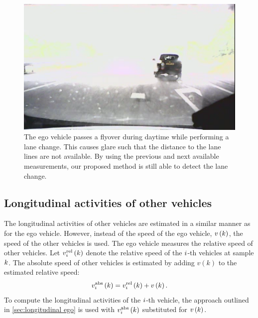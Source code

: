 \begin{figure}
	\centering
	\includegraphics[width=\linewidth]{figures/glare}
	\caption{\cstarta The ego vehicle passes a flyover during daytime while performing a lane change. This causes glare such that the distance to the lane lines are not available. By using the previous and next available measurements, our proposed method is still able to detect the lane change.\cenda}
	\label{fig:glare}
\end{figure}



\subsection{Longitudinal activities of other vehicles}
\label{sec:longitudinal other vehicles}

The longitudinal activities of other vehicles are estimated in a similar manner as for the ego vehicle. However, instead of the speed of the ego vehicle, $v\left(k\right)$, the speed of the other vehicles is used. The ego vehicle measures the relative speed of other vehicles. Let $v_{i}^{\mathrm{rel}}\left(k\right)$ denote the relative speed of the $i$-th vehicles at sample $k$. The absolute speed of other vehicles is estimated by adding $v(k)$ to the estimated relative speed:
\begin{equation}
	v_{i}^{\mathrm{abs}}\left(k\right) = v_{i}^{\mathrm{rel}}\left(k\right) + v\left(k\right).
\end{equation}
To compute the longitudinal activities of the $i$-th vehicle, the approach outlined in \cref{sec:longitudinal ego} is used with $v_{i}^{\mathrm{abs}}\left(k\right)$ substituted for $v\left(k\right)$. 

